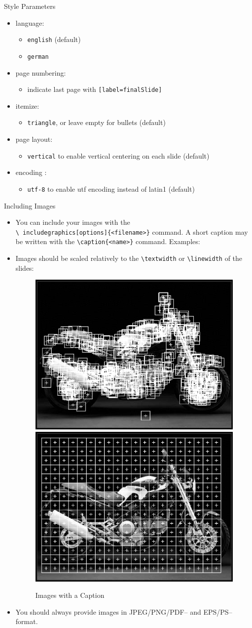 \documentclass[xcolor=table,mathserif,9pt]{beamer}    %
\begin{document}
\begin{frame}{Style Parameters}
\begin{itemize}
\item language: 
  \begin{itemize}
  \item \texttt{english} (default)
  \item \texttt{german}
  \end{itemize}
\item page numbering:
\begin{itemize}
 \item indicate last page with \texttt{[label=finalSlide]}
\end{itemize}
\item itemize: 
  \begin{itemize}
  \item \texttt{triangle}, or leave empty for bullets (default)
  \end{itemize}
\item page layout: 
  \begin{itemize}
  \item \texttt{vertical} to enable vertical centering on each slide (default)
  \end{itemize}
\item encoding : 
  \begin{itemize}
  \item \texttt{utf-8} to enable utf encoding instead of latin1 (default)
  \end{itemize}
\end{itemize}
\end{frame}

\begin{frame}{Including Images}
\begin{itemize}
\item[] You can include your images with the \\ \texttt{\textbackslash
    includegraphics[options]\{<filename>\}} command. A short caption may be
  written with the \texttt{\textbackslash caption\{<name>\}} command. Examples:
\item[] Images should be scaled relatively to the \texttt{\textbackslash textwidth} or \texttt{\textbackslash linewidth} of the slides:
  \begin{center}
  \begin{figure}
      \includegraphics[width=.15\textwidth]{images/salientpoints}
    \includegraphics[width=.15\linewidth]{images/grid}
    \caption{Images with a Caption}
  \end{figure}
  \end{center}
\item[] You should always provide images in JPEG/PNG/PDF-- \alert{and}
  EPS/PS--format.
\end{itemize}
\end{frame}
\end{document}
